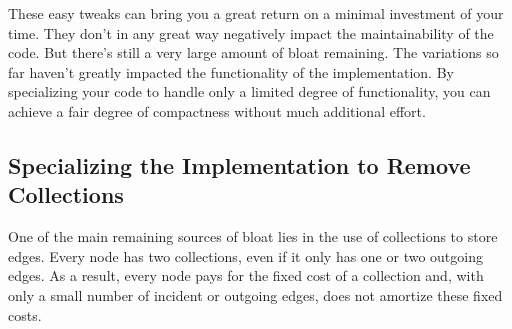 

These easy tweaks can bring you a great return on a minimal investment of your
time. They don't in any great way negatively impact the maintainability of the
code. But there's still a very large amount of bloat remaining. The variations
so far haven't greatly impacted the functionality of the implementation. By
specializing your code to handle only a limited degree of functionality, you can
achieve a fair degree of compactness without much additional effort.

\subsection{Specializing the Implementation to Remove Collections}
\label{sec:graph-removing-collections}
One of the main remaining sources of bloat lies in the use of collections to
store edges. Every node has two collections, even if it only has one or two
outgoing edges. As a result, every node pays for the fixed cost of a collection
and, with only a small number of incident or outgoing edges, does not amortize
these fixed costs.

